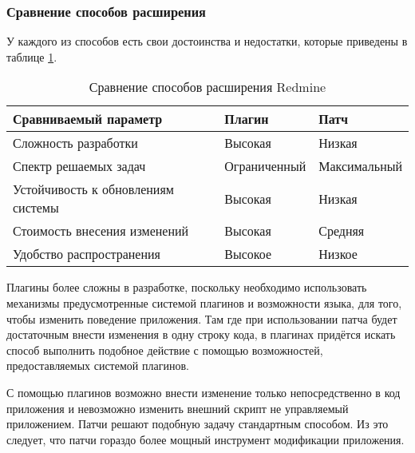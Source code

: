 \subsubsection{Сравнение способов расширения}
У каждого из способов есть свои достоинства и недостатки, которые приведены в
таблице \ref{comparing_extensions}.
\begin{table}[hb!]

\makeatletter
\def\@makecaption#1#2{
  \vskip\abovecaptionskip
  \sbox\@tempboxa{#2 #1}
  \begin{flushright}
    #1
  \end{flushright}
  \begin{center}
    \textbf{#2}
  \end{center}
  \vskip\belowcaptionskip}
\makeatother

\caption{Сравнение способов расширения Redmine}
\small
\centering
\begin{tabular}{ 
|>{\centering\arraybackslash}m{}
|>{\centering\arraybackslash}m{}
|>{\centering\arraybackslash}m{}|}
\hline
\textbf{Сравниваемый параметр} & \textbf{Плагин} & \textbf{Патч}\\
\hline
Сложность разработки & Высокая & Низкая \\
\hline
Спектр решаемых задач & Ограниченный & Максимальный\\
\hline
Устойчивость к обновлениям системы & Высокая & Низкая \\
\hline
Стоимость внесения изменений & Высокая & Средняя \\
\hline
Удобство распространения & Высокое & Низкое \\
\hline
\end{tabular}

\label{comparing_extensions}
\end{table}

Плагины более сложны в разработке, поскольку необходимо использовать
механизмы предусмотренные системой плагинов и возможности языка, для того,
чтобы изменить поведение приложения. Там где при использовании патча будет
достаточным внести изменения в одну строку кода, в плагинах придётся искать
способ выполнить подобное действие с помощью возможностей, предоставляемых
системой плагинов.

С помощью плагинов возможно внести изменение только непосредственно в код
приложения и невозможно изменить внешний скрипт не управляемый приложением.
Патчи решают подобную задачу стандартным способом. Из это следует, что патчи
гораздо более мощный инструмент модификации приложения.

